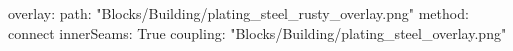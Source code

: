overlay:
  path: "Blocks/Building/plating_steel_rusty_overlay.png"
  method: connect
  innerSeams: True
  coupling: "Blocks/Building/plating_steel_overlay.png"

